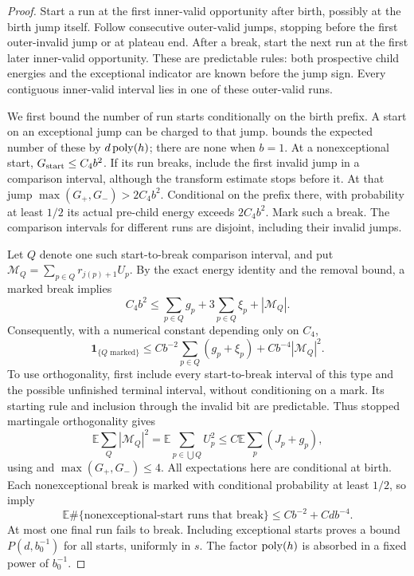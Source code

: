 \begin{proof}
Start a run at the first inner-valid opportunity after birth, possibly at
the birth jump itself.  Follow consecutive outer-valid jumps, stopping
before the first outer-invalid jump or at plateau end.  After a break,
start the next run at the first later inner-valid opportunity.  These are
predictable rules: both prospective child energies and the exceptional
indicator are known before the jump sign.  Every contiguous inner-valid
interval lies in one of these outer-valid runs.

We first bound the number of run starts conditionally on the birth
prefix.  A start on an exceptional jump can be charged to that jump.
 bounds the expected number of these by
$d\operatorname{poly}(h)$; there are none when $b=1$.  At a nonexceptional start,
$G_{\rm start}\le C_4b^2$.  If its run breaks, include the first invalid
jump in a comparison interval, although the transform estimate stops
before it.  At that jump $\max(G_+,G_-)>2C_4b^2$.  Conditional on the
prefix there, with probability at least $1/2$ its actual pre-child energy
exceeds $2C_4b^2$.  Mark such a break.  The comparison intervals for
different runs are disjoint, including their invalid jumps.

Let $Q$ denote one such start-to-break comparison interval, and put
$\mathcal M_Q=\sum_{p\in Q}r_{j(p)+1}U_p$.  By the exact energy identity
and the removal bound, a marked break implies
\[
 C_4b^2\le\sum_{p\in Q}g_p+3\sum_{p\in Q}\xi_p+|\mathcal M_Q|.
\]
Consequently, with a numerical constant depending only on $C_4$,
\begin{equation}
 \mathbf1_{\{Q\text{ marked}\}}
 \le Cb^{-2}\sum_{p\in Q}(g_p+\xi_p)+Cb^{-4}|\mathcal M_Q|^2.
 \label{eq:paths-marked-break}
\end{equation}
To use orthogonality, first include every start-to-break interval of this
type and the possible unfinished terminal interval, without conditioning
on a mark.  Its starting rule and inclusion through the invalid bit are
predictable.  Thus stopped martingale orthogonality gives
\[
 \mathbb E\sum_Q|\mathcal M_Q|^2
 =\mathbb E\sum_{p\in\bigcup Q}U_p^2
 \le C\mathbb E\sum_p(J_p+g_p),
\]
using  and $\max(G_+,G_-)\le4$.  All
expectations here are conditional at birth.  Each nonexceptional break
is marked with conditional probability at least $1/2$, so
 imply
\[
 \mathbb E\#\{\text{nonexceptional-start runs that break}\}
 \le Cb^{-2}+Cdb^{-4}.
\]
At most one final run fails to break.  Including exceptional starts
proves a bound $P(d,b_0^{-1})$ for all starts, uniformly in $s$.  The
factor $\operatorname{poly}(h)$ is absorbed in a fixed power of $b_0^{-1}$.


\end{proof}
